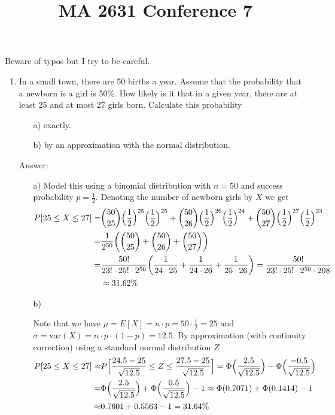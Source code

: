 \documentclass{article}
\title{MA 2631 Conference 7}
\begin{document}
\maketitle

Beware of typos but I try to be careful.

\begin{enumerate}

\item

In a small town, there are 50 births a year. Assume that the probability that a newborn is a girl is 50\%. How likely is it that in a given year, there are at least 25 and at most 27 girls born. Calculate this probability
\begin{itemize}
	\item[a)] exactly.
	\item[b)] by an approximation with the normal distribution.
\end{itemize}

Answer:

\begin{itemize}
	
	
	\item[a)] Model this using a binomial distribution with 	$n = 50$ and success probability $p=\frac{1}{2}$. Denoting the number of newborn girls by $X$ we get
	\begin{align*}
	P[25 \leq X \leq 27] = &\binom{50}{25}\Bigl(\frac{1}{2}\Bigr)^{25} \Bigl(\frac{1}{2}\Bigr)^{25} + \binom{50}{26}\Bigl(\frac{1}{2}\Bigr)^{26} \Bigl(\frac{1}{2}\Bigr)^{24} + \binom{50}{27}\Bigl(\frac{1}{2}\Bigr)^{27} \Bigl(\frac{1}{2}\Bigr)^{23} \\
	= & \frac{1}{2^{50}} \biggl( \binom{50}{25} + \binom{50}{26} + \binom{50}{27}\biggr)\\ \
	= & \frac{50!}{23! \cdot 25! \cdot 2^{50}} \biggl( \frac{1}{24\cdot25} + \frac{1}{24\cdot 26} + \frac{1}{25\cdot26}\biggr) =  \frac{50!}{23! \cdot25! \cdot 2^{50} \cdot 208} \\
	&\approx 31.62\%
	\end{align*}
	
	\item[b)]
	
	Note that we have $\mu = E[X] = n \cdot p = 50 \cdot \frac{1}{2} = 25$ and $\sigma = \text{var}(X) = n \cdot p \cdot (1-p) = 12.5$. By approximation (with continuity correction) using a standard normal distribution $Z$
	\begin{align*}
	P[25 \leq X \leq 27] \approx &P\Bigl[ \frac{24.5 - 25}{\sqrt{12.5}} \leq Z \leq \frac{27.5 - 25}{\sqrt{12.5}}\Bigr] = \Phi\Bigl(\frac{2.5}{\sqrt{12.5}}\Bigr) - \Phi\Bigl(\frac{-0.5}{\sqrt{12.5}}\Bigr)\\
	=& \Phi\Bigl(\frac{2.5}{\sqrt{12.5}}\Bigr) + \Phi\Bigl(\frac{0.5}{\sqrt{12.5}}\Bigr) -1 \approx \Phi(0.7071) + \Phi(0.1414) - 1 \\
	\approx & 0.7601 + 0.5563 -1 = 31.64\%
	\end{align*}	
	

\end{itemize}
\end{enumerate}
\end{document}

